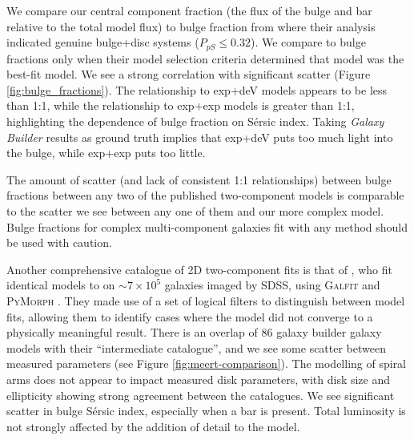 \documentclass[trackchanges]{aastex63}
\begin{document}
We compare our central component fraction (the flux of the bulge and bar relative to the total model flux) to bulge fraction from \citet{2011ApJS..196...11S} where their analysis indicated genuine bulge+disc systems ($P_{pS} \le 0.32$). We compare to \citet{2012MNRAS.421.2277L} bulge fractions only when their model selection criteria determined that model was the best-fit model. We see a strong correlation with significant scatter (Figure \ref{fig:bulge_fractions}). The relationship to exp+deV models appears to be less than 1:1, while the relationship to exp+exp models is greater than 1:1, highlighting the dependence of bulge fraction on S\'ersic index. Taking \textit{Galaxy Builder} results as ground truth implies that exp+deV puts too much light into the bulge, while exp+exp puts too little.

The amount of scatter (and lack of consistent 1:1 relationships) between bulge fractions between any two of the published two-component models is comparable to the scatter we see between any one of them and our more complex model. Bulge fractions for complex multi-component galaxies fit with any method should be used with caution.

\begin{figure*}
  \caption{Scatter plots comparing the ratio of flux from central components (bulge and bar) to the total flux between fitted models from \textit{Galaxy Builder} and two-component models in the literature. Our models are broadly consistent with their results, but should be more accurate for complex galaxies, as we account for galaxy bars.}
  \label{fig:bulge_fractions}
\end{figure*}

Another comprehensive catalogue of 2D two-component fits is that of \citet{2015MNRAS.446.3943M}, who fit identical models to \citet{2011ApJS..196...11S} on $\sim 7 \times 10^5$ galaxies imaged by SDSS, using \textsc{Galfit} and \textsc{PyMorph} \citep{2010MNRAS.409.1379V}. They made use of a set of logical filters to distinguish between model fits, allowing them to identify cases where the model did not converge to a physically meaningful result. There is an overlap of 86 galaxy builder galaxy models with their ``intermediate catalogue'', and we see some scatter between measured parameters (see Figure \ref{fig:meert-comparison}). The modelling of spiral arms does not appear to impact measured disk parameters, with disk size and ellipticity showing strong agreement between the catalogues. We see significant scatter in bulge S\'ersic index, especially when a bar is present. Total luminosity is not strongly affected by the addition of detail to the model.
\end{document}
